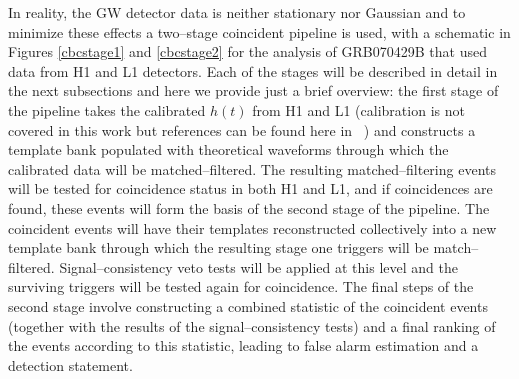 In reality, the GW detector data is neither stationary nor Gaussian and to minimize these effects a two--stage coincident pipeline is used, with a schematic in Figures \ref{cbcstage1} and \ref{cbcstage2} for the analysis of GRB070429B that used data from H1 and L1 detectors. Each of the stages will be described in detail in the next subsections and here we provide just a brief overview: the first stage of the pipeline takes the calibrated $h(t)$ from H1 and L1 (calibration is not covered in this work but references can be found here in ~\cite{Abadie:2010px, Allen:1996, Adhikari:2003}) and constructs a template bank populated with theoretical waveforms through which the calibrated data will be matched--filtered. The resulting matched--filtering events will be tested for coincidence status in both H1 and L1, and if coincidences are found, these events will form the basis of the second stage of the pipeline. The coincident events will have their templates reconstructed collectively into a new template bank through which the resulting stage one triggers will be match--filtered. Signal--consistency veto tests will be applied at this level and the surviving triggers will be tested again for coincidence. The final steps of the second stage involve constructing a combined statistic of the coincident events (together with the results of the signal--consistency tests) and a final ranking of the events according to this statistic, leading to false alarm estimation and a detection statement.
%
